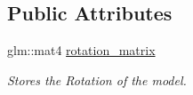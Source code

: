 \subsection*{Public Attributes}
\begin{DoxyCompactItemize}
\item 
glm\+::mat4 \hyperlink{classcft_1_1Model_ae734ccf60224cd323840ad561639110b}{rotation\+\_\+matrix}\hypertarget{classcft_1_1Model_ae734ccf60224cd323840ad561639110b}{}\label{classcft_1_1Model_ae734ccf60224cd323840ad561639110b}

\begin{DoxyCompactList}\small\item\em Stores the Rotation of the model. \end{DoxyCompactList}\end{DoxyCompactItemize}
{\bf }\par
